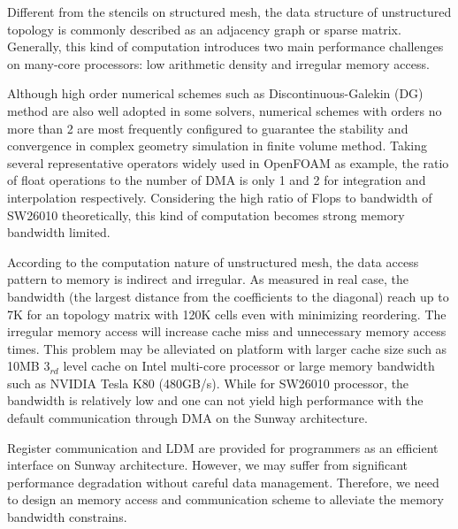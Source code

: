 \documentclass[conference]{IEEEtran}
\begin{document}

Different from the stencils on structured mesh, the data structure of unstructured topology is commonly described as an adjacency graph or sparse matrix. Generally, this kind of computation introduces two main performance challenges on many-core processors: low arithmetic density and irregular memory access.

Although high order numerical schemes such as Discontinuous-Galekin (DG) method are also well adopted in some solvers, numerical schemes with orders no more than 2 are most frequently configured to guarantee the stability and convergence in complex geometry simulation in finite volume method. Taking several representative operators widely used in OpenFOAM as example, the ratio of float operations to the number of DMA is only 1 and 2 for integration and interpolation respectively. Considering the high ratio of Flops to bandwidth of SW26010 theoretically, this kind of computation becomes strong memory bandwidth limited.

According to the computation nature of unstructured mesh, the data access pattern to memory is indirect and irregular. As measured in real case, the bandwidth (the largest distance from the coefficients to the diagonal) reach up to 7K for an topology matrix with 120K cells even with minimizing reordering. The irregular memory access will increase cache miss and unnecessary memory access times. This problem may be alleviated on platform with larger cache size such as 10MB $3_{rd}$ level cache on Intel multi-core processor or large memory bandwidth such as NVIDIA Tesla K80 (480GB/s). While for SW26010 processor, the bandwidth is relatively low and one can not yield high performance with the default communication through DMA on the Sunway architecture. 

Register communication and LDM are provided for programmers as an efficient interface on Sunway architecture. However, we may suffer from significant performance degradation without careful data management. Therefore, we need to design an memory access and communication scheme to alleviate the memory bandwidth constrains.
\end{document}
